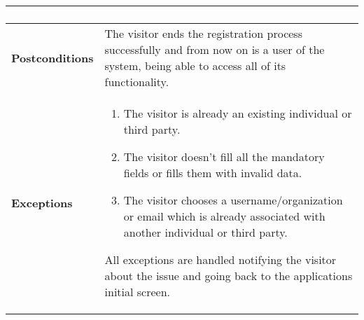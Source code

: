 \documentclass[12pt]{article}
\begin{document}
\begin{center}
\begin{tabular} { |p{}|p{}| }
\begin{enumerate}[topsep=0pt]
                            \end{enumerate} \\
        \hline
        \textbf{Postconditions} & The visitor ends the registration process successfully and from now on is a user of the system, being able to access all of its functionality. \\
        \hline
        \textbf{Exceptions} & \begin{enumerate}[topsep=0pt]
                            \setlength{\itemsep}{0.5pt}
                            \item The visitor is already an existing individual or third party. 
                            \item The visitor doesn't fill all the mandatory fields or fills them with invalid data.
                            \item The visitor chooses a username/organization or email which is already associated with another individual or third party.
                            \end{enumerate} 
                            All exceptions are handled notifying the visitor about the issue and going back to the applications initial screen.\\ 
        \hline
    \end{tabular}
\end{center}

\newpage
\end{document}
